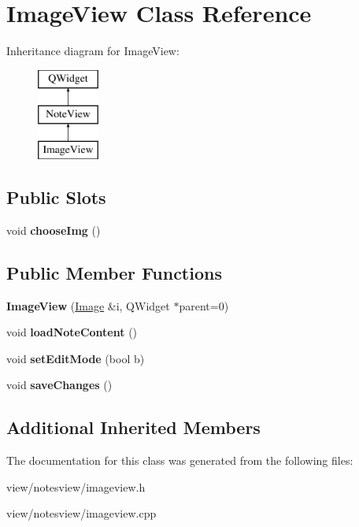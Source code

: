 \hypertarget{class_image_view}{\section{Image\-View Class Reference}
\label{class_image_view}
}
Inheritance diagram for Image\-View\-:\begin{figure}[H]
\begin{center}
\leavevmode
\includegraphics[height=3.000000cm]{class_image_view}
\end{center}
\end{figure}
\subsection*{Public Slots}
\begin{DoxyCompactItemize}
\item 
\hypertarget{class_image_view_a618ab680d2022c89802b72c2b9ae3cb0}{void {\bfseries choose\-Img} ()}\label{class_image_view_a618ab680d2022c89802b72c2b9ae3cb0}

\end{DoxyCompactItemize}
\subsection*{Public Member Functions}
\begin{DoxyCompactItemize}
\item 
\hypertarget{class_image_view_af9c6a46aed77e75cf1d5657e0462b6fc}{{\bfseries Image\-View} (\hyperlink{class_image}{Image} \&i, Q\-Widget $\ast$parent=0)}\label{class_image_view_af9c6a46aed77e75cf1d5657e0462b6fc}

\item 
\hypertarget{class_image_view_a33987a6dc1c138977a3b6f35bffc7c74}{void {\bfseries load\-Note\-Content} ()}\label{class_image_view_a33987a6dc1c138977a3b6f35bffc7c74}

\item 
\hypertarget{class_image_view_ade1413eedb974b12aa70047d82a6e7ec}{void {\bfseries set\-Edit\-Mode} (bool b)}\label{class_image_view_ade1413eedb974b12aa70047d82a6e7ec}

\item 
\hypertarget{class_image_view_aa0b728d807cf22a28c4a35b564891662}{void {\bfseries save\-Changes} ()}\label{class_image_view_aa0b728d807cf22a28c4a35b564891662}

\end{DoxyCompactItemize}
\subsection*{Additional Inherited Members}


The documentation for this class was generated from the following files\-:\begin{DoxyCompactItemize}
\item 
view/notesview/imageview.\-h\item 
view/notesview/imageview.\-cpp\end{DoxyCompactItemize}
